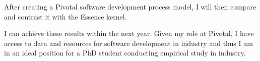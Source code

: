 \documentclass[preprint,12pt,3p]{elsarticle}
\begin{document}
After creating a Pivotal software development process model, I will then compare and contrast it with the Essence kernel.

I can achieve these results within the next year. Given my role at Pivotal, I have access to data and resources for software development in industry and thus I am in an ideal position for a PhD student conducting empirical study in industry.



\end{document}
